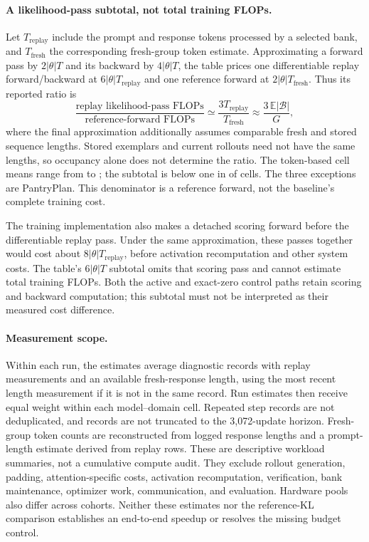 \documentclass{article}
\newcommand{\1}{\mathbf 1}
\newcommand{\E}{\mathbb E}
\theoremstyle{remark}
\theoremstyle{definition}
\theoremstyle{plain}
\begin{document}
\paragraph{A likelihood-pass subtotal, not total training FLOPs.}
Let $T_{\mathrm{replay}}$ include the prompt and response tokens processed
by a selected bank, and $T_{\mathrm{fresh}}$ the corresponding fresh-group
token estimate. Approximating a forward pass by $2|\theta|T$ and its backward
by $4|\theta|T$, the table prices one differentiable replay forward/backward
at $6|\theta|T_{\mathrm{replay}}$ and one reference forward at
$2|\theta|T_{\mathrm{fresh}}$. Thus its reported ratio is
\begin{equation}
  \frac{\text{replay likelihood-pass FLOPs}}{\text{reference-forward FLOPs}}
  \simeq \frac{3T_{\mathrm{replay}}}{T_{\mathrm{fresh}}}
  \approx \frac{3\,\E|\mathcal B|}{G},
  \label{eq:replay-flop-ratio}
\end{equation}
where the final approximation additionally assumes comparable fresh and
stored sequence lengths. Stored exemplars and current rollouts need not have
the same lengths, so occupancy alone does not determine the ratio. The
token-based cell means range from \MDcostRatioMin{} to \MDcostRatioMax{};
the subtotal is below one in \MDcostCellsBelow{} of \MDcostCellsTotal{} cells.
The three exceptions are PantryPlan. This denominator is a reference
forward, not the baseline's complete training cost.

The training implementation also makes a detached scoring forward before
the differentiable replay pass. Under the same approximation, these passes
together would cost about $8|\theta|T_{\mathrm{replay}}$, before activation
recomputation and other system costs. The table's $6|\theta|T$ subtotal omits
that scoring pass and cannot estimate total training FLOPs. Both the
active and exact-zero control paths retain scoring and backward computation;
this subtotal must not be interpreted as their measured cost difference.

\paragraph{Measurement scope.}
Within each run, the estimates average diagnostic records with replay
measurements and an available fresh-response length, using the most recent
length measurement if it is not in the same record. Run estimates then receive
equal weight within each model--domain cell. Repeated step records are not
deduplicated, and records are not truncated to the 3,072-update horizon. Fresh-group token
counts are reconstructed from logged response lengths and a prompt-length
estimate derived from replay rows. These are descriptive workload summaries,
not a cumulative compute audit. They exclude rollout generation, padding,
attention-specific costs, activation recomputation, verification, bank
maintenance, optimizer work, communication, and evaluation. Hardware pools
also differ across cohorts. Neither these estimates nor the reference-KL
comparison establishes an end-to-end speedup or resolves the missing budget
control.
\end{document}
